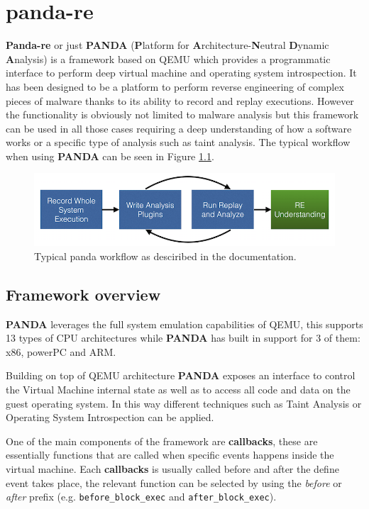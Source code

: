 \chapter{panda-re}
\label{chap:4}

\textbf{Panda-re} or just \textbf{PANDA} (\textbf{P}latform  for  \textbf{A}rchitecture-\textbf{N}eutral  \textbf{D}ynamic  \textbf{A}nalysis) is a framework based on QEMU which provides a programmatic interface to perform deep virtual machine and operating system introspection. It has been designed to be a platform to perform reverse engineering of complex pieces of malware thanks to its ability to record and replay executions. However the functionality is obviously not limited to malware analysis but this framework can be used in all those cases requiring a deep understanding of how a software works or a specific type of analysis such as taint analysis. The typical workflow when using \textbf{PANDA} can be seen in Figure \ref{fig:wkflow}.

\begin{figure}[htp]
\centering
\includegraphics[width=\linewidth]{images/panda_workflow.png}
\caption{Typical panda workflow as desciribed in the documentation.}
\label{fig:wkflow}
\end{figure}


\section{Framework overview}

\textbf{PANDA} leverages the full system emulation capabilities of QEMU, this supports 13 types of CPU architectures while \textbf{PANDA} has built in support for 3 of them: x86, powerPC and ARM. 

Building on top of QEMU architecture \textbf{PANDA} exposes an interface to control the Virtual Machine internal state as well as to access all code and data on the guest operating system. In this way different techniques such as Taint Analysis or Operating System Introspection can be applied.

One of the main components of the framework are \textbf{callbacks}, these are essentially functions that are called when specific events happens inside the virtual machine. Each \textbf{callbacks} is usually called before and after the define event takes place, the relevant function can be selected by using the \textit{before} or \textit{after} prefix (e.g. \lstinline{before_block_exec} and \lstinline{after_block_exec}).

